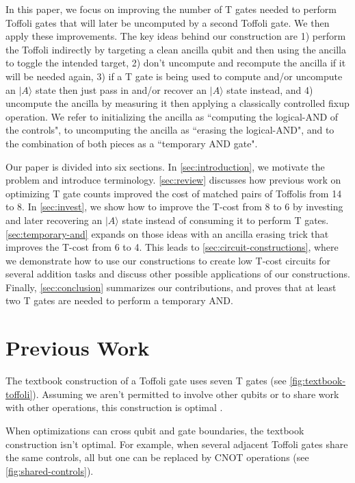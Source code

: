 \documentclass[twocolumn,longbibliography]{quantumarticle-customized}
\begin{document}
In this paper, we focus on improving the number of T gates needed to perform Toffoli gates that will later be uncomputed by a second Toffoli gate.
We then apply these improvements.
The key ideas behind our construction are 1) perform the Toffoli indirectly by targeting a clean ancilla qubit and then using the ancilla to toggle the intended target, 2) don't uncompute and recompute the ancilla if it will be needed again, 3) if a T gate is being used to compute and/or uncompute an $|A\rangle$ state then just pass in and/or recover an $|A\rangle$ state instead, and 4) uncompute the ancilla by measuring it then applying a classically controlled fixup operation.
We refer to initializing the ancilla as ``computing the logical-AND of the controls", to uncomputing the ancilla as ``erasing the logical-AND", and to the combination of both pieces as a ``temporary AND gate".

Our paper is divided into six sections.
In \autoref{sec:introduction}, we motivate the problem and introduce terminology.
\autoref{sec:review} discusses how previous work on optimizing T gate counts improved the cost of matched pairs of Toffolis from 14 to 8.
In \autoref{sec:invest}, we show how to improve the T-cost from 8 to 6 by investing and later recovering an $|A\rangle$ state instead of consuming it to perform T gates.
\autoref{sec:temporary-and} expands on those ideas with an ancilla erasing trick that improves the T-cost from 6 to 4.
This leads to \autoref{sec:circuit-constructions}, where we demonstrate how to use our constructions to create low T-cost circuits for several addition tasks and discuss other possible applications of our constructions.
Finally, \autoref{sec:conclusion} summarizes our contributions, and proves that at least two T gates are needed to perform a temporary AND.


\section{Previous Work}
\label{sec:review}

The textbook construction of a Toffoli gate uses seven T gates \cite{Nielsen2009} (see \autoref{fig:textbook-toffoli}).
Assuming we aren't permitted to involve other qubits or to share work with other operations, this construction is optimal \cite{Gosset2014}.

When optimizations can cross qubit and gate boundaries, the textbook construction isn't optimal.
For example, when several adjacent Toffoli gates share the same controls, all but one can be replaced by CNOT operations (see \autoref{fig:shared-controls}).
\end{document}
